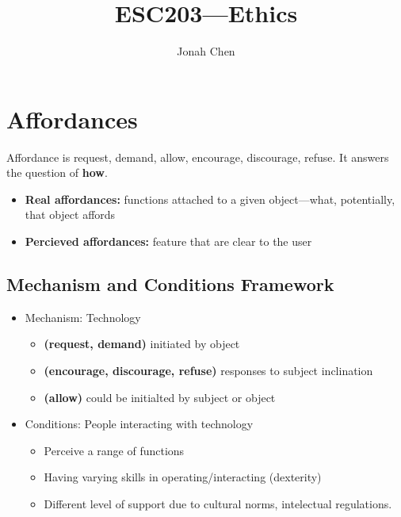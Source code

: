 \documentclass[a4paper]{article}
\title{ESC203---Ethics}
\author{Jonah Chen}
\numberwithin{equation}{section}
\begin{document}
\sffamily
\maketitle
\tableofcontents

\section{Affordances}

Affordance is request, demand, allow, encourage, discourage, refuse. It answers the question of \textbf{how}.

\begin{itemize}
    \item \textbf{Real affordances:} functions attached to a given object---what, potentially, that object affords
    \item \textbf{Percieved affordances:} feature that are clear to the user
\end{itemize}

\subsection{Mechanism and Conditions Framework}
\begin{itemize}
    \item Mechanism: Technology
    \begin{itemize}
        \item \textbf{(request, demand)} initiated by object
        \item \textbf{(encourage, discourage, refuse)} responses to subject inclination
        \item \textbf{(allow)} could be initialted by subject or object
    \end{itemize} 
    \item Conditions: People interacting with technology
    \begin{itemize}
        \item Perceive a range of functions
        \item Having varying skills in operating/interacting (dexterity)
        \item Different level of support due to cultural norms, intelectual regulations.
    \end{itemize}
\end{itemize}
\end{document}
